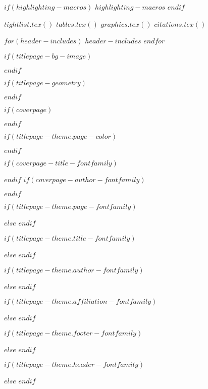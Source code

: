 $if(highlighting-macros)$
$highlighting-macros$
$endif$

$tightlist.tex()$
$tables.tex()$
$graphics.tex()$
$citations.tex()$

$for(header-includes)$
$header-includes$
$endfor$

\usepackage{hyphenat}
\usepackage{ifthen}
\usepackage{calc}
\usepackage{calculator}

$if(titlepage-bg-image)$
\usepackage{graphicx}
\usepackage{wallpaper}
$endif$

$if(titlepage-geometry)$
\usepackage{geometry}
$endif$

$if(coverpage)$
\usepackage{graphicx}
\usepackage{geometry}
\usepackage{afterpage}
\usepackage{tikz}
\usetikzlibrary{calc}
\usetikzlibrary{fadings}
\usepackage[pagecolor=none]{pagecolor}
$endif$

$if(titlepage-theme.page-color)$
\usepackage[pagecolor=none]{pagecolor}
$endif$

$if(coverpage-title-fontfamily)$
\usepackage{fontspec}
$endif$
$if(coverpage-author-fontfamily)$
\usepackage{fontspec}
$endif$

$if(titlepage-theme.page-fontfamily)$
\usepackage{fontspec}
$else$
\newcommand{\titlepagefont}{}
$endif$

$if(titlepage-theme.title-fontfamily)$
\usepackage{fontspec}
$else$
\newcommand{\titlepagetitlefont}{}
$endif$

$if(titlepage-theme.author-fontfamily)$
\usepackage{fontspec}
$else$
\newcommand{\titlepageauthorfont}{}
$endif$

$if(titlepage-theme.affiliation-fontfamily)$
\usepackage{fontspec}
$else$
\newcommand{\titlepageaffiliationfont}{}
$endif$

$if(titlepage-theme.footer-fontfamily)$
\usepackage{fontspec}
$else$
\newcommand{\titlepagefooterfont}{}
$endif$

$if(titlepage-theme.header-fontfamily)$
\usepackage{fontspec}
$else$
\newcommand{\titlepageheaderfont}{}
$endif$

